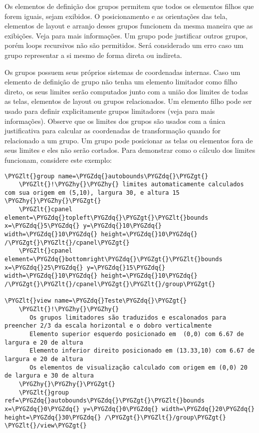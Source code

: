 \documentclass[letterpaper,10pt,brazil]{sphinxmanual}
\def\PYGZlt{\char`\<}
\def\PYGZgt{\char`\>}
\def\PYGZhy{\char`\-}
\def\PYGZdq{\char`\"}
\begin{document}
Os elementos de definição dos grupos permitem que todos os elementos
filhos que forem iguais, sejam exibidos. O posicionamento e as
orientações das tela, elementos de layout e arranjo desses grupos
funcionem da mesma maneira que as exibições.
Veja {\hyperref[techspecs/layout_files:layout\string-parts\string-views]{}} para mais informações.
Um grupo pode justificar outros grupos, porém loops recursivos não são
permitidos. Será considerado um erro caso um grupo representar a si
mesmo de forma direta ou indireta.

Os grupos possuem seus próprios sistemas de coordenadas internas.
Caso um elemento de definição de grupo não tenha um elemento limitador
 como filho direto, os seus limites serão computados junto com
a união dos limites de todas as telas, elementos de layout ou grupos
relacionados.
Um elemento filho  pode ser usado para definir
explicitamente grupos limitadores
(veja {\hyperref[techspecs/layout_files:layout\string-concepts\string-coordinates]{}} para mais informações).
Observe que os limites dos grupos são usados com a única justificativa
para calcular as coordenadas de transformação quando for relacionado
a um grupo.
Um grupo pode posicionar as telas ou elementos fora de seus limites e eles
não serão cortados.
\clearpage
Para demonstrar como o cálculo dos limites funcionam, considere este
exemplo:

\begin{Verbatim}[commandchars=\\\{\}]
\PYGZlt{}group name=\PYGZdq{}autobounds\PYGZdq{}\PYGZgt{}
    \PYGZlt{}!\PYGZhy{}\PYGZhy{} limites automaticamente calculados com sua origem em (5,10), largura 30, e altura 15 \PYGZhy{}\PYGZhy{}\PYGZgt{}
    \PYGZlt{}cpanel element=\PYGZdq{}topleft\PYGZdq{}\PYGZgt{}\PYGZlt{}bounds x=\PYGZdq{}5\PYGZdq{} y=\PYGZdq{}10\PYGZdq{} width=\PYGZdq{}10\PYGZdq{} height=\PYGZdq{}10\PYGZdq{} /\PYGZgt{}\PYGZlt{}/cpanel\PYGZgt{}
    \PYGZlt{}cpanel element=\PYGZdq{}bottomright\PYGZdq{}\PYGZgt{}\PYGZlt{}bounds x=\PYGZdq{}25\PYGZdq{} y=\PYGZdq{}15\PYGZdq{} width=\PYGZdq{}10\PYGZdq{} height=\PYGZdq{}10\PYGZdq{} /\PYGZgt{}\PYGZlt{}/cpanel\PYGZgt{}\PYGZlt{}/group\PYGZgt{}

\PYGZlt{}view name=\PYGZdq{}Teste\PYGZdq{}\PYGZgt{}
    \PYGZlt{}!\PYGZhy{}\PYGZhy{}
       Os grupos limitadores são traduzidos e escalonados para preencher 2/3 da escala horizontal e o dobro verticalmente
       Elemento superior esquerdo posicionado em  (0,0) com 6.67 de largura e 20 de altura
       Elemento inferior direito posicionado em (13.33,10) com 6.67 de largura e 20 de altura
       Os elementos de visualização calculado com origem em (0,0) 20 de largura e 30 de altura
    \PYGZhy{}\PYGZhy{}\PYGZgt{}
    \PYGZlt{}group ref=\PYGZdq{}autobounds\PYGZdq{}\PYGZgt{}\PYGZlt{}bounds x=\PYGZdq{}0\PYGZdq{} y=\PYGZdq{}0\PYGZdq{} width=\PYGZdq{}20\PYGZdq{} height=\PYGZdq{}30\PYGZdq{} /\PYGZgt{}\PYGZlt{}/group\PYGZgt{}
\PYGZlt{}/view\PYGZgt{}
\end{Verbatim}
\end{document}
